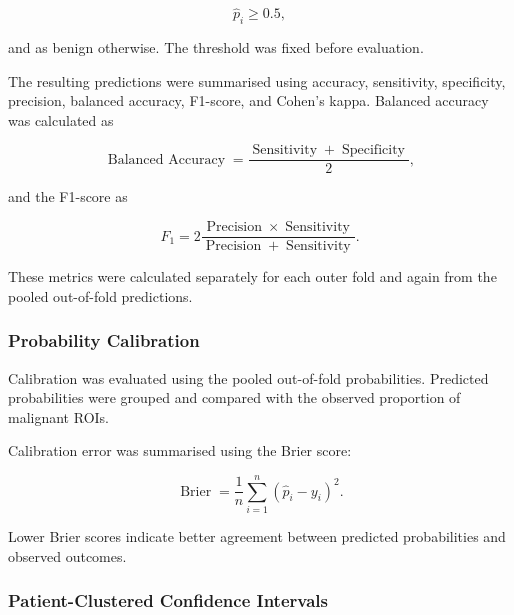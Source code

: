 \documentclass[12pt,twocolumn]{article}
\begin{document}
\begin{equation}
\widehat{p}_i \geq 0.5,
\label{eq:classification_threshold}
\end{equation}

and as benign otherwise. The threshold was fixed before evaluation.

The resulting predictions were summarised using accuracy, sensitivity,
specificity, precision, balanced accuracy, F1-score, and Cohen's kappa.
Balanced accuracy was calculated as

\begin{equation}
\operatorname{Balanced\ Accuracy}
=
\frac{
\operatorname{Sensitivity}
+
\operatorname{Specificity}
}{2},
\label{eq:balanced_accuracy}
\end{equation}

and the F1-score as

\begin{equation}
F_1
=
2
\frac{
\operatorname{Precision}
\times
\operatorname{Sensitivity}
}{
\operatorname{Precision}
+
\operatorname{Sensitivity}
}.
\label{eq:f1_score}
\end{equation}

These metrics were calculated separately for each outer fold and again
from the pooled out-of-fold predictions.

\subsubsection{Probability Calibration}
\label{subsubsec:probability_calibration}

Calibration was evaluated using the pooled out-of-fold probabilities.
Predicted probabilities were grouped and compared with the observed
proportion of malignant ROIs.

Calibration error was summarised using the Brier score:

\begin{equation}
\operatorname{Brier}
=
\frac{1}{n}
\sum_{i=1}^{n}
\left(
\widehat{p}_i-y_i
\right)^2.
\label{eq:brier_score}
\end{equation}

Lower Brier scores indicate better agreement between predicted
probabilities and observed outcomes.

\subsubsection{Patient-Clustered Confidence Intervals}
\label{subsubsec:clustered_confidence_intervals}
\end{document}
